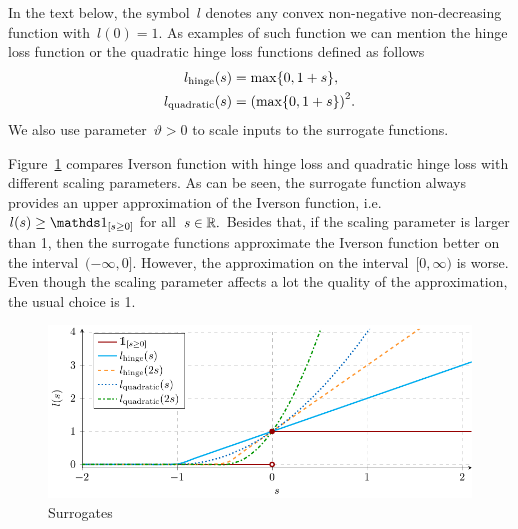 \begin{notation}\label{not: surrogates}
  In the text below, the symbol~$l$ denotes any convex non-negative non-decreasing function with~$l(0) = 1$. As examples of such function we can mention the hinge loss function or the quadratic hinge loss functions defined as follows
  \begin{equation*}
    \begin{aligned}
      l_{\text{hinge}}(s) & = \max\Brac[c]{0, 1 + s}, \\
      l_{\text{quadratic}}(s) & = \Brac{\max\Brac[c]{0, 1 + s}}^2.\\
    \end{aligned}
  \end{equation*}
  We also use parameter~$\vartheta > 0$ to scale inputs to the surrogate functions.
\end{notation}

Figure~\ref{fig: surrogates} compares Iverson function with hinge loss and quadratic hinge loss with different scaling parameters. As can be seen, the surrogate function always provides an upper approximation of the Iverson function, i.e.~$l(s) \ge \Iverson{s \ge 0}$ for all~$s \in \mathbb{R}.$ Besides that, if the scaling parameter is larger than 1, then the surrogate functions approximate the Iverson function better on the interval~$(-\infty, 0]$. However, the approximation on the interval~$[0, \infty)$ is worse. Even though the scaling parameter affects a lot the quality of the approximation, the usual choice is 1.

\begin{figure}[t]
  \centering
  \includegraphics[width = \linewidth]{images/surrogates.pdf}
  \caption{Surrogates}
  \label{fig: surrogates}
\end{figure}

